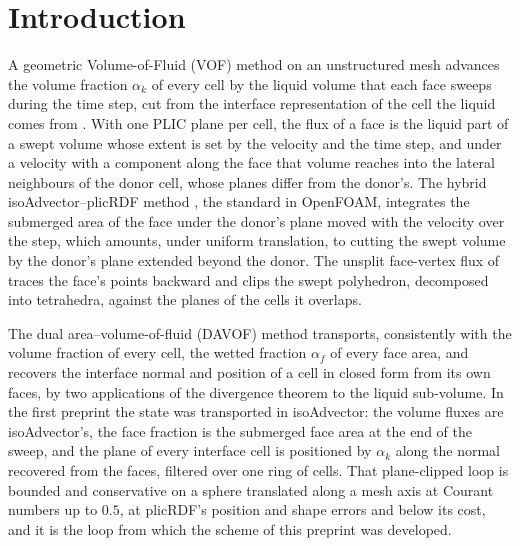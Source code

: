 \documentclass[preprint,12pt]{elsarticle}
\begin{document}
\section{Introduction}
\label{sec:intro}

A geometric Volume-of-Fluid (VOF) method on an unstructured mesh advances the volume fraction $\alpha_k$ of every cell by the liquid volume that each face sweeps during the time step, cut from the interface representation of the cell the liquid comes from \citep{MaricKotheBothe2020}. With one PLIC plane per cell, the flux of a face is the liquid part of a swept volume whose extent is set by the velocity and the time step, and under a velocity with a component along the face that volume reaches into the lateral neighbours of the donor cell, whose planes differ from the donor's. The hybrid isoAdvector--plicRDF method \citep{RoenbyEtAl2016,ScheuflerRoenby2019,ScheuflerRoenby2023TwoPhaseFlow}, the standard in OpenFOAM, integrates the submerged area of the face under the donor's plane moved with the velocity over the step, which amounts, under uniform translation, to cutting the swept volume by the donor's plane extended beyond the donor. The unsplit face-vertex flux of \citet{MaricMarschallBothe2018} traces the face's points backward and clips the swept polyhedron, decomposed into tetrahedra, against the planes of the cells it overlaps.

The dual area--volume-of-fluid (DAVOF) method \citep{MaricDAVOF2026} transports, consistently with the volume fraction of every cell, the wetted fraction $\alpha_f$ of every face area, and recovers the interface normal and position of a cell in closed form from its own faces, by two applications of the divergence theorem to the liquid sub-volume. In the first preprint the state was transported in isoAdvector: the volume fluxes are isoAdvector's, the face fraction is the submerged face area at the end of the sweep, and the plane of every interface cell is positioned by $\alpha_k$ along the normal recovered from the faces, filtered over one ring of cells. That plane-clipped loop is bounded and conservative on a sphere translated along a mesh axis at Courant numbers up to $0.5$, at plicRDF's position and shape errors and below its cost, and it is the loop from which the scheme of this preprint was developed.
\end{document}
